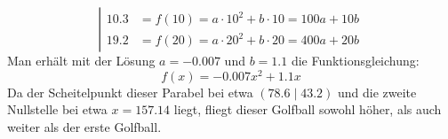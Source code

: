 \begin{exercise}
\begin{enumerate}[a)]
\begin{equation*}
              \left|
              \begin{aligned}
                \num{10.3}&=f(10)=a\cdot\num{10}^2+b\cdot\num{10}=100a+10b\\
                \num{19.2}&=f(20)=a\cdot\num{20}^2+b\cdot\num{20}=400a+20b
              \end{aligned}
              \right.
            \end{equation*}
            Man erhält mit der Lösung $a=\num{-0.007}$ und $b=\num{1.1}$ die Funktionsgleichung:
            \begin{equation*}
              f(x)=\num{-0.007}x^2+\num{1.1}x
            \end{equation*}
            Da der Scheitelpunkt dieser Parabel bei etwa $(\num{78.6}\mid\num{43.2})$
            und die zweite Nullstelle bei etwa $x=\num{157.14}$ liegt, fliegt dieser Golfball
            sowohl höher, als auch weiter als der erste Golfball.
    \end{enumerate}
  \fi
\end{exercise}

